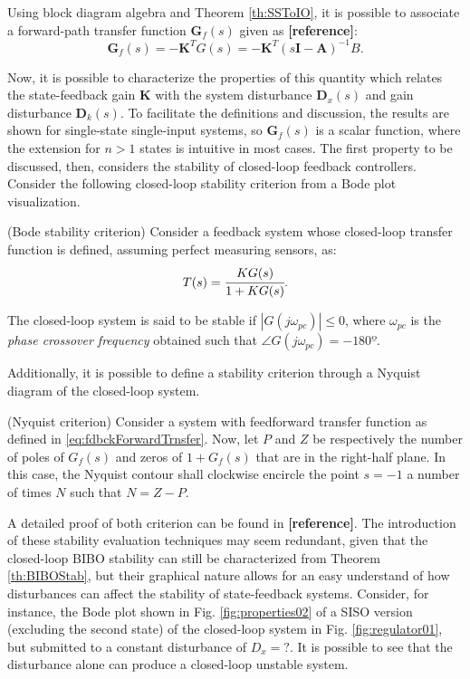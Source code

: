 \documentclass[a4paper,11pt]{book}
\numberwithin{figure}{chapter}
\numberwithin{equation}{chapter}
\numberwithin{table}{chapter}
\newtheorem{theorem}{Theorem}[chapter]
\theoremstyle{definition}
\newcounter{boxed-theorem}
\newenvironment{boxed-theorem}[1]
{\begin{shaded} \begin{theorem}{#1}}
{\end{theorem} \end{shaded}}
\newcounter{boxed-definition}
\begin{document}
Using block diagram algebra and Theorem \ref{th:SSToIO}, it is possible to associate a forward-path transfer function $\bm{G}_{f}(s)$ given as \textbf{[reference]}:
\begin{equation} \label{eq:fdbckForwardTrnsfer}
    \bm{G}_{f}(s) = -\bm{K}^T G(s) =  -\bm{K}^{T} \left(s \bm{I} - \bm{A} \right)^{-1} B 
.\end{equation}

Now, it is possible to characterize the properties of this quantity which relates the state-feedback gain $\bm{K}$ with the system disturbance $\bm{D}_x(s)$ and gain disturbance $\bm{D}_k(s)$. To facilitate the definitions and discussion, the results are shown for single-state single-input systems, so $\bm{G}_f(s)$ is a scalar function, where the extension for $n > 1$ states is intuitive in most cases. The first property to be discussed, then, considers the stability of closed-loop feedback controllers. Consider the following closed-loop stability criterion from a Bode plot visualization.

\begin{boxed-theorem}{(Bode stability criterion)}
    Consider a feedback system whose closed-loop transfer function is defined, assuming perfect measuring sensors, as:
    \begin{equation}
        T(s) = \cfrac{K G(s)}{1 + K G(s)}
    .\end{equation}
    
    The closed-loop system is said to be stable if $| G(j \omega_{pc}) | \leq 0 $, where $\omega_{pc}$ is the \textit{phase crossover frequency} obtained such that $\angle G(j \omega_{pc}) = -180º$.
\end{boxed-theorem}

Additionally, it is possible to define a stability criterion through a Nyquist diagram of the closed-loop system.

\begin{boxed-theorem}{(Nyquist criterion)}
    Consider a system with feedforward transfer function as defined in \eqref{eq:fdbckForwardTrnsfer}. Now, let $P$ and $Z$ be respectively the number of poles of $G_{f}(s)$ and zeros of $1 + G_{f}(s)$ that are in the right-half plane. In this case, the Nyquist contour shall clockwise encircle the point $s = -1$ a number of times $N$ such that $N = Z - P$.
\end{boxed-theorem}

A detailed proof of both criterion can be found in \textbf{[reference]}. The introduction of these stability evaluation techniques may seem redundant, given that the closed-loop BIBO stability can still be characterized from Theorem \ref{th:BIBOStab}, but their graphical nature allows for an easy understand of how disturbances can affect the stability of state-feedback systems. Consider, for instance, the Bode plot shown in Fig. \ref{fig:properties02} of a SISO version (excluding the second state) of the closed-loop system in Fig. \ref{fig:regulator01}, but submitted to a constant disturbance of $D_x = ?$. It is possible to see that the disturbance alone can produce a closed-loop unstable system. 
\end{document}
